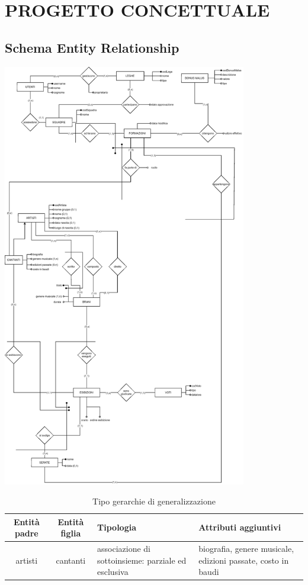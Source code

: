 \documentclass[a4paper,12pt]{article}
\begin{document}
\section{PROGETTO CONCETTUALE}
\subsection{Schema Entity Relationship}
\begin{center}
	\includegraphics[width=0.8\textwidth]{schema_ER.eps}
\end{center}

\begin{table}[h!]
	\centering
	\begin{tabular}{|c|c|p{5cm}|p{5cm}|}
		\hline
		\textbf{Entità padre} & \textbf{Entità figlia} & \textbf{Tipologia} & \textbf{Attributi aggiuntivi} \\ \hline
		artisti & cantanti & associazione di sottoinsieme: parziale ed esclusiva & biografia, genere musicale, edizioni passate, costo in baudi \\ \hline
	\end{tabular}
	\caption{Tipo gerarchie di generalizzazione}
\end{table}
\end{document}
